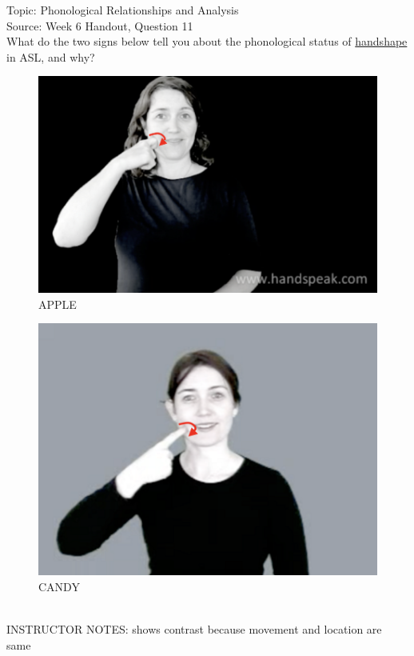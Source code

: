 \documentclass[12pt]{article}
\begin{document}
Topic: Phonological Relationships and Analysis\\
Source: Week 6 Handout, Question 11\\

What do the two signs below tell you about the phonological status of \underline{handshape} in ASL, and why?\\

\begin{figure}[H]
\includegraphics{../images/asl_apple.png}
\caption{APPLE}
\end{figure}
\begin{figure}[H]
\includegraphics{../images/asl_candy.png}
\caption{CANDY}
\end{figure}

~\\
INSTRUCTOR NOTES: shows contrast because movement and location are same
\end{document}

